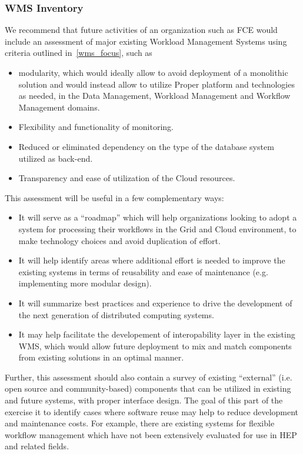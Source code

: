 \subsubsection*{WMS Inventory}
We recommend that future activities of an organization such as FCE would include an assessment of major existing Workload Management Systems
using criteria outlined in~\ref{wms_focus}, such as
\begin{itemize}
\item modularity, which would ideally allow to avoid deployment of a monolithic solution and would instead allow to
utilize Proper platform and technologies as needed, in the Data Management, Workload Management and Workflow Management domains.
\item Flexibility and functionality of monitoring.
\item Reduced or eliminated dependency on the type of the database system utilized as back-end.
\item Transparency and ease of utilization of the Cloud resources.
\end{itemize}
This assessment will be useful in a few complementary ways:
\begin{itemize}
\item It will serve as a ``roadmap'' which will help organizations looking to adopt a system for processing their workflows in the Grid and Cloud environment,
to make technology choices and avoid duplication of effort.
\item It will help identify areas where additional effort is needed to improve the existing systems in terms of reusability and ease of maintenance (e.g.
implementing more modular design).
\item It will summarize best practices and experience to drive the development of the next generation of distributed computing systems.
\item It may help facilitate the developement of interopability layer in the existing WMS, which would allow future deployment to mix and match components
from existing solutions in an optimal manner.
\end{itemize}
Further, this assessment should also contain a survey of existing ``external'' (i.e. open source and community-based) components that can be utilized
in existing and future systems,  with proper interface design. The goal of this part of the exercise it to identify cases where software reuse may help
to reduce development and maintenance costs. For example, there are existing systems for flexible workflow management which have not been
extensively evaluated for use in HEP and related fields.

